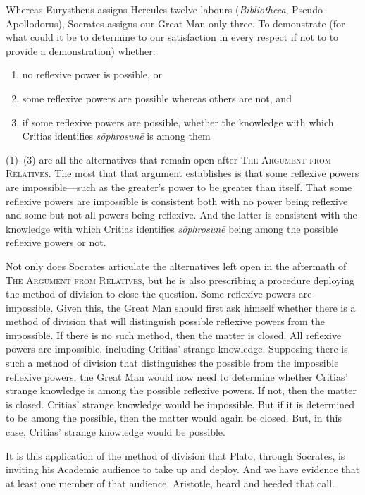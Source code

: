 Whereas Eurystheus assigns Hercules twelve labours (\emph{Bibliotheca}, Pseudo-Apol\-lo\-dorus), Socrates assigns our Great Man only three. To demonstrate (for what could it be to determine to our satisfaction in every respect if not to to provide a demonstration) whether:
\begin{enumerate}[(1)]
	\item no reflexive power is possible, or
	\item some reflexive powers are possible whereas others are not, and
	\item if some reflexive powers are possible, whether the knowledge with which Critias identifies \emph{sōphrosunē} is among them
\end{enumerate}
(1)–(3) are all the alternatives that remain open after \textsc{The Argument from Relatives}. The most that that argument establishes is that some reflexive powers are impossible—such as the greater's power to be greater than itself. That some reflexive powers are impossible is consistent both with no power being reflexive and some but not all powers being reflexive. And the latter is consistent with the knowledge with which Critias identifies \emph{sōphrosunē} being among the possible reflexive powers or not.

Not only does Socrates articulate the alternatives left open in the aftermath of \textsc{The Argument from Relatives}, but he is also prescribing a procedure deploying the method of division to close the question. Some reflexive powers are impossible. Given this, the Great Man should first ask himself whether there is a method of division that will distinguish possible reflexive powers from the impossible. If there is no such method, then the matter is closed. All reflexive powers are impossible, including Critias' strange knowledge. Supposing there is such a method of division that distinguishes the possible from the impossible reflexive powers, the Great Man would now need to determine whether Critias' strange knowledge is among the possible reflexive powers. If not, then the matter is closed. Critias' strange knowledge would be impossible. But if it is determined to be among the possible, then the matter would again be closed. But, in this case, Critias' strange knowledge would be possible.

It is this application of the method of division that Plato, through Socrates, is inviting his Academic audience to take up and deploy. And we have evidence that at least one member of that audience, Aristotle, heard and heeded that call.


